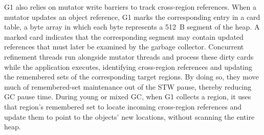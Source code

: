 G1 also relies on mutator write barriers to track cross-region references.
When a mutator updates an object reference, G1 marks the corresponding entry in a card table, a byte array in which each byte represents a \SI{512}{B} segment of the heap.
A marked card indicates that the corresponding segment may contain updated references that must later be examined by the garbage collector.
Concurrent refinement threads run alongside mutator threads and process these dirty cards while the application executes, identifying cross-region references and updating the remembered sets of the corresponding target regions.
By doing so, they move much of remembered-set maintenance out of the STW pause, thereby reducing GC pause time.
During young or mixed GC, when G1 collects a region, it uses that region’s remembered set to locate incoming cross-region references and update them to point to the objects’ new locations, without scanning the entire heap.

